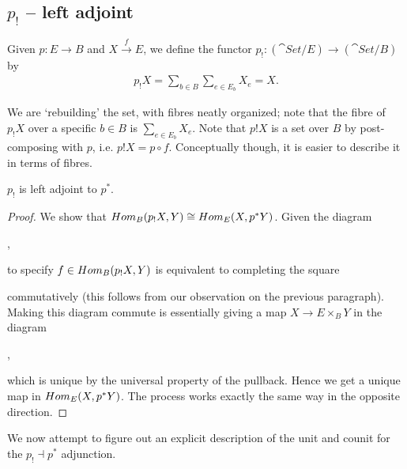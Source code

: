 \subsection{$p_!$ -- left adjoint}
Given $p: E\to B$ and $X\overset{f}{\to} E$, we define the functor $p_! : (\cat{Set}/ E)\to(\cat{Set}/ B)$ by
\begin{align*}
	p_!X = \sum_{b\in B} \sum_{e\in E_b} X_{e} = X.
\end{align*}

We are `rebuilding' the set, with fibres neatly organized; note that the fibre of $p_!X$ over a specific $b\in B$ is $\sum_{e\in E_b} X_e$. Note that $p!X$ is a set over $B$ by post-composing with $p$, i.e. $p!X = p \circ f$. Conceptually though, it is easier to describe it in terms of fibres.

\begin{proposition}
	$p_!$ is left adjoint to $p^*$.
\end{proposition}
\begin{proof}
	We show that $Hom_B(p_!X,Y) \cong Hom_E(X, p^*Y)$. Given the diagram
	\begin{center}
	,
	\end{center}
	to specify $f\in Hom_B(p_!X,Y)$ is equivalent to completing the square
	\begin{center}
	\end{center}
	commutatively (this follows from our observation on the previous paragraph). Making this diagram commute is essentially giving a map $X\to E\times_B Y$ in the diagram
	\begin{center}
	,
	\end{center}
	which is unique by the universal property of the pullback. Hence we get a unique map in $Hom_E(X,p^*Y)$. The process works exactly the same way in the opposite direction.
\end{proof}

We now attempt to figure out an explicit description of the unit and counit for the $p_! \dashv p^*$ adjunction.

\pagebreak
